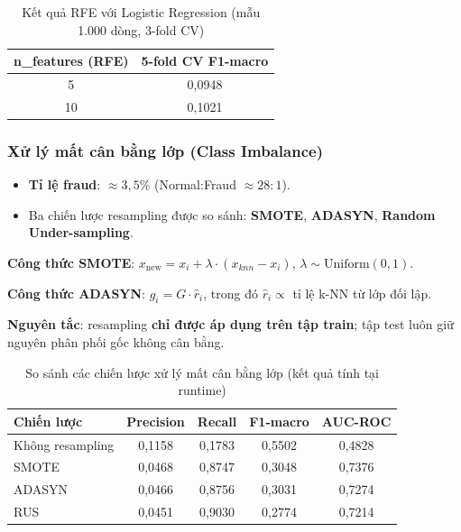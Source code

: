 \documentclass[12pt,a4paper]{article}
\let\oldtextbf\textbf
\renewcommand{\textbf}[1]{\oldtextbf{\textcolor{hcmublue}{#1}}}
\begin{document}
\begin{table}[H]
\centering
\begin{tabular}{|c|c|}
\hline
\textbf{n\_features (RFE)} & \textbf{5-fold CV F1-macro} \\ \hline
5  & 0{,}0948 \\ \hline
10 & 0{,}1021 \\ \hline
\end{tabular}
\caption{Kết quả RFE với Logistic Regression (mẫu 1.000 dòng, 3-fold CV)}
\label{tab:rfe_results}
\end{table}

\subsubsection{Xử lý mất cân bằng lớp (Class Imbalance)}

\begin{itemize}
    \item \textbf{Tỉ lệ fraud}: $\approx 3{,}5\%$ (Normal:Fraud $\approx 28:1$).
    \item Ba chiến lược resampling được so sánh: \textbf{SMOTE}, \textbf{ADASYN}, \textbf{Random Under-sampling}.
\end{itemize}

\textbf{Công thức SMOTE}: $x_{\text{new}} = x_i + \lambda \cdot (x_{knn} - x_i)$, $\lambda \sim \text{Uniform}(0, 1)$.

\textbf{Công thức ADASYN}: $g_i = G \cdot \hat{r}_i$, trong đó $\hat{r}_i \propto$ tỉ lệ k-NN từ lớp đối lập.

\textbf{Nguyên tắc}: resampling \textbf{chỉ được áp dụng trên tập train}; tập test luôn giữ nguyên phân phối gốc không cân bằng.

\begin{table}[H]
\centering
\begin{tabular}{|l|c|c|c|c|}
\hline
\textbf{Chiến lược} & \textbf{Precision} & \textbf{Recall} & \textbf{F1-macro} & \textbf{AUC-ROC} \\ \hline
Không resampling & 0{,}1158 & 0{,}1783 & 0{,}5502 & 0{,}4828 \\ \hline
SMOTE            & 0{,}0468 & 0{,}8747 & 0{,}3048 & 0{,}7376 \\ \hline
ADASYN           & 0{,}0466 & 0{,}8756 & 0{,}3031 & 0{,}7274 \\ \hline
RUS              & 0{,}0451 & 0{,}9030 & 0{,}2774 & 0{,}7214 \\ \hline
\end{tabular}
\caption{So sánh các chiến lược xử lý mất cân bằng lớp (kết quả tính tại runtime)}
\label{tab:imbalance_methods}
\end{table}
\end{document}
